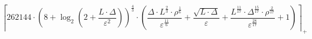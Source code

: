 \[\left\lceil 262144 \cdot \left(8 + \log_{2}\left(2 + \frac{L \cdot \Delta}{\varepsilon^{2}}\right)\right)^{\frac{4}{3}} \cdot \left(\frac{\Delta \cdot L^{\frac{2}{3}} \cdot \rho^{\frac{1}{6}}}{\varepsilon^{\frac{11}{6}}} + \frac{\sqrt{L \cdot \Delta}}{\varepsilon} + \frac{L^{\frac{11}{17}} \cdot \Delta^{\frac{15}{17}} \cdot \rho^{\frac{2}{17}}}{\varepsilon^{\frac{28}{17}}} + 1\right) \right\rceil_{+}\]
